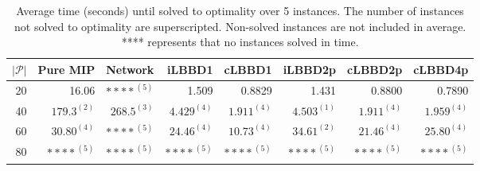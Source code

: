 \begin{table*}
    \centering
    \caption{Average time (seconds) until solved to optimality over 5 instances. The number of instances not solved to optimality are superscripted. Non-solved instances are not included in average. **** represents that no instances solved in time.}
    \begin{tabular}{rrrrrrrr} \toprule
        $|\mathcal{P}|$ & Pure MIP & Network & iLBBD1 & cLBBD1 & iLBBD2p & cLBBD2p & cLBBD4p \\ \midrule
        20              & 16.06 &     ${****}^{(5)}$    & 1.509 &  0.8829 & 1.431 & 0.8800 & 0.7890 \\
        40              & $179.3^{(2)}$ & $268.5^{(3)}$   &  $4.429^{(4)}$ & $1.911^{(4)}$ & $4.503^{(1)}$ & $1.911^{(4)}$ & $1.959^{(4)}$ \\
        60 & $30.80^{(4)}$ & ${****}^{(5)}$ & $24.46^{(4)}$ & $10.73^{(4)}$ & $34.61^{(2)}$ & $21.46^{(4)}$ & $25.80^{(4)}$ \\
        80 & ${****}^{(5)}$ & ${****}^{(5)}$ & ${****}^{(5)}$ & ${****}^{(5)}$ & ${****}^{(5)}$ & ${****}^{(5)}$ & ${****}^{(5)}$ \\
        \bottomrule
    \end{tabular}
\end{table*}
